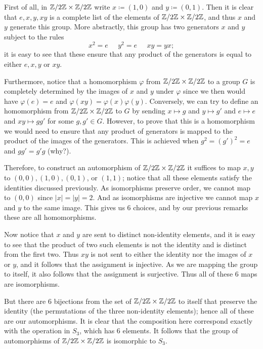 \begin{solution}
	First of all, in $\mathbb{Z}/2\mathbb{Z}\times \mathbb{Z}/2\mathbb{Z}$ write $x\coloneqq (1,0)$ and $y\coloneqq (0,1)$. Then it is clear that $e,x,y,xy$ is a complete list of the elements of $\mathbb{Z}/2\mathbb{Z}\times \mathbb{Z}/2\mathbb{Z}$, and thus $x$ and $y$ generate this group. More abstractly, this group has two generators $x$ and $y$ subject to the rules
	\[
		x^2 = e\;\;\;\;\; y^2 = e \;\;\;\;\; xy = yx;
	\]
	it is easy to see that these ensure that any product of the generators is equal to either $e,x,y$ or $xy$.
	
	Furthermore, notice that a homomorphism $\varphi$ from $\mathbb{Z}/2\mathbb{Z}\times \mathbb{Z}/2\mathbb{Z}$ to a group $G$ is completely determined by the images of $x$ and $y$ under $\varphi$ since we then would have $\varphi(e) = e$ and $\varphi(xy) = \varphi(x)\varphi(y)$. Conversely, we can try to define an homomorphism from $\mathbb{Z}/2\mathbb{Z}\times \mathbb{Z}/2\mathbb{Z}$ to $G$ by sending  $x\mapsto g$ and $y\mapsto g'$ and $e\mapsto e$ and $xy\mapsto gg'$ for some $g,g'\in G$. However, to prove that this is a homomorphism we would need to ensure that any product of generators is mapped to the product of the images of the generators. This is achieved when $g^2=(g')^2 = e$ and $gg' = g'g$ (why?).
	
	Therefore, to construct an automorphism of $\mathbb{Z}/2\mathbb{Z}\times \mathbb{Z}/2\mathbb{Z}$ it suffices to map $x,y$ to $(0,0),(1,0),(0,1)$, or $(1,1)$; notice that all these elements satisfy the identities discussed previously. As isomorphisms preserve order, we cannot map to $(0,0)$ since $|x| = |y| = 2$. And as isomorphisms are injective we cannot map $x$ and $y$ to the same image. This gives us 6 choices, and by our previous remarks these are all homomorphisms. 
	
	Now notice that $x$ and $y$ are sent to distinct non-identity elements, and it is easy to see that the product of two such elements is not the identity and is distinct from the first two. Thus $xy$ is not sent to either the identity nor the images of $x$ or $y$, and it follows that the assignment is injective. As we are mapping the group to itself, it also follows that the assignment is surjective. Thus all of these 6 maps are isomorphisms.
	
	But there are 6 bijections from the set of $\mathbb{Z}/2\mathbb{Z}\times \mathbb{Z}/2\mathbb{Z}$ to itself that preserve the identity (the permutations of the three non-identity elements); hence all of these are our automorphisms. It is clear that the composition here correspond exactly with the operation in $S_3$, which has 6 elements. It follows that the group of automorphisms of $\mathbb{Z}/2\mathbb{Z}\times \mathbb{Z}/2\mathbb{Z}$ is isomorphic to $S_3$.	
\end{solution}

